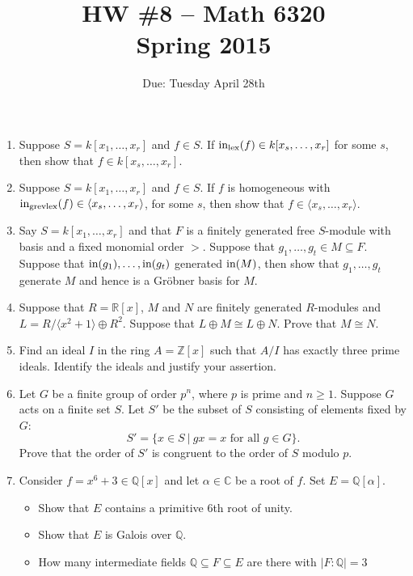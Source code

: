 \documentclass[11pt]{amsart}
\theoremstyle{theorem}
\newcommand{\bR}{{\mathbb{R}}}
\newcommand{\bQ}{\mathbb{Q}}
\newcommand{\bZ}{\mathbb{Z}}
\newcommand{\bC}{\mathbb{C}}
\newcommand{\init}{\textnormal{in}}
\newcommand{\lex}{\textnormal{lex}}
\newcommand{\grevlex}{\textnormal{grevlex}}
\begin{document}
\title{HW \#8 -- Math 6320\\Spring 2015}
\author{Due: Tuesday April 28th}
\maketitle

\begin{enumerate}
\item Suppose $S = k[x_1, \ldots, x_r]$ and $f \in S$.  If $\init_{\lex}(f) \in k[x_s, \ldots, x_r]$ for some $s$, then show that $f \in k[x_s, \ldots, x_r]$.
\item Suppose $S = k[x_1, \ldots, x_r]$ and $f \in S$.  If $f$ is homogeneous with $\init_{\grevlex}(f) \in \langle x_s, \ldots, x_r \rangle$, for some $s$, then show that $f \in \langle x_s, \ldots, x_r \rangle$.
\item Say $S = k[x_1, \ldots, x_r]$ and that $F$ is a finitely generated free $S$-module with basis and a fixed monomial order $>$.  Suppose that $g_1, \ldots, g_t \in M \subseteq F$.  Suppose that $\init(g_1), \ldots, \init(g_t)$ generated $\init(M)$, then show that $g_1, \ldots, g_t$ generate $M$ and hence is a Gr\"obner basis for $M$.  
\item Suppose that $R = \bR[x]$, $M$ and $N$ are finitely generated $R$-modules and $L = R/\langle x^2 + 1 \rangle \oplus R^2$.  Suppose that $L \oplus M \cong L \oplus N$.  Prove that $M \cong N$.
\item Find an ideal $I$ in the ring $A = \bZ[x]$ such that $A/I$ has exactly three prime ideals. Identify the
ideals and justify your assertion.
\item Let $G$ be a finite group of order $p^n$, where $p$ is prime and $n\geq 1$. Suppose $G$
acts on a finite set $S$. Let $S'$ be the subset of $S$ consisting of elements fixed by $G$:
$$
S'=\{x\in S\ |\ gx=x\text{ for all }g\in G\}.
$$
Prove that the order of $S'$ is congruent to the order of $S$ modulo $p$.
\item Consider $f = x^6 + 3 \in \bQ[x]$  and let $\alpha \in \bC$ be a root of $f$.  Set $E = \bQ[\alpha]$.  
\begin{itemize}
\item[(a)]  Show that $E$ contains a primitive $6$th root of unity.  
\item[(b)]  Show that $E$ is Galois over $\bQ$.  
\item[(c)]  How many intermediate fields $\bQ \subseteq F \subseteq E$ are there with $|F : \bQ| = 3$
\end{itemize}
\end{enumerate}
\end{document}
